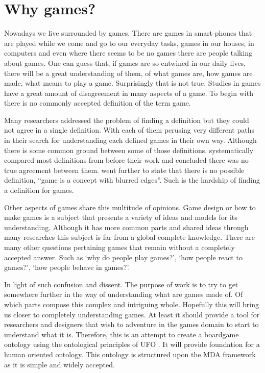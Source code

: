 \section{Why games?}

Nowadays we live surrounded by games. There are games in smart-phones that are played while we come and go to our everyday tasks, games in our houses, in computers and even where there seems to be no games there are people talking about games. One can guess that, if games are so entwined in our daily lives, there will be a great understanding of them, of what games are, how games are made, what means to play a game. Surprisingly that is not true. Studies in games have a great amount of disagreement in many aspects of a game. To begin with there is no commonly accepted definition of the term game. 

Many researchers addressed the problem of finding a definition \citep{jarvinen2009games,salen2004rules,crawford1984art,schell2014art,juul2010game} but they could not agree in a single definition. With each of them perusing very different paths in their search for understanding each defined games in their own way. Although there is some common ground between some of those definitions. \cite{salen2004rules} systematically compared most definitions from before their work and concluded there was no true agreement between them. \cite{wittgenstein_philosophical_2009} went further to state that there is no possible definition, ``game is a concept with blurred edges''. Such is the hardship of finding a definition for games.

Other aspects of games share this multitude of opinions. Game design or how to make games is a subject that presents a variety of ideas and models for its understanding. Although it has more common parts and shared ideas through many researches this subject is far from a global complete knowledge. There are many other questions pertaining games that remain without a completely accepted answer. Such as `why do people play games?', `how people react to games?', `how people behave in games?'.

In light of such confusion and dissent. The purpose of work is to try to get somewhere further in the way of understanding what are games made of. Of which parts compose this complex and intriguing whole. Hopefully this will bring us closer to completely understanding games. At least it should provide a tool for researchers and designers that wish to adventure in the games domain to start to understand what it is. Therefore, this is an attempt to create a boardgame ontology using the ontological principles of UFO \citep{guizzardi_ontological_2005}. It will provide foundation for a human oriented ontology. This ontology is structured upon the MDA framework \citep{Hunicke2004} as it is simple and widely accepted. 
